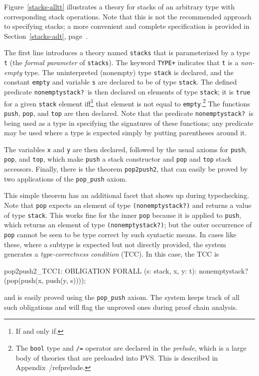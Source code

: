 Figure~\ref{stacks-alltt} illustrates a theory for stacks of an arbitrary
type with corresponding stack operations.  Note that this is not the
recommended approach to specifying stacks; a more convenient and complete
specification is provided in Section~\ref{stacks-adt},
page~\pageref{stacks-adt}.

The first line introduces a theory named \texttt{stacks} that is
parameterized by a type \texttt{t} (the \emph{formal parameter} of
\texttt{stacks}).  The keyword \texttt{TYPE+} indicates that \texttt{t} is
a \emph{non-empty} type.  The uninterpreted (nonempty) type \texttt{stack}
is declared, and the constant \texttt{empty} and variable \texttt{s} are
declared to be of type \texttt{stack}.  The defined predicate
\texttt{nonemptystack?}~is then declared on elements of type
\texttt{stack}; it is \texttt{true} for a given \texttt{stack} element
iff\footnote{If and only if.} that element is not equal to
\texttt{empty}.\footnote{The \texttt{bool} type and \texttt{/=} operator
are declared in the \emph{prelude}, which is a large body of theories that
are preloaded into PVS.  This is described in Appendix~/ref{prelude}.}
The functions \texttt{push}, \texttt{pop}, and \texttt{top} are then
declared.  Note that the predicate \texttt{nonemptystack?}~is being used
as a type in specifying the signatures of these functions; any predicate
may be used where a type is expected simply by putting parentheses around
it.

The variables \texttt{x} and \texttt{y} are then declared, followed by the
usual axioms for \texttt{push}, \texttt{pop}, and \texttt{top}, which make
\texttt{push} a stack constructor and \texttt{pop} and \texttt{top} stack
accessors.  Finally, there is the theorem \texttt{pop2push2}, that can
easily be proved by two applications of the \texttt{pop\_push} axiom.

This simple theorem has an additional facet that shows up during
typechecking.  Note that \texttt{pop} expects an element of type
\texttt{(nonemptystack?)} and returns a value of type \texttt{stack}.
This works fine for the inner \texttt{pop} because it is applied to
\texttt{push}, which returns an element of type \texttt{(nonemptystack?)};
but the outer occurrence of \texttt{pop} cannot be seen to be type correct
by such syntactic means.  In cases like these, where a subtype is expected
but not directly provided, the system generates a \emph{type-correctness
condition} (TCC).  In this case, the TCC is
\begin{pvsex}
  pop2push2_TCC1: OBLIGATION
    FORALL (s: stack, x, y: t): nonemptystack?(pop(push(x, push(y, s))));
\end{pvsex}
and is easily proved using the \texttt{pop\_push} axiom.  The system keeps
track of all such obligations and will flag the unproved ones during proof
chain analysis.

